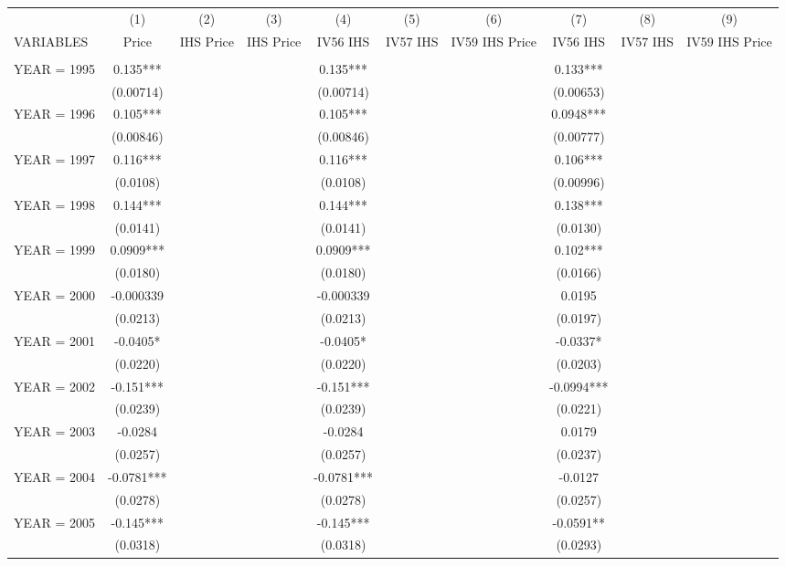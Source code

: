 \begin{tabular}{lccccccccc} \hline
 & (1) & (2) & (3) & (4) & (5) & (6) & (7) & (8) & (9) \\
VARIABLES & Price & IHS Price & IHS Price & IV56 IHS & IV57 IHS & IV59 IHS Price & IV56 IHS & IV57 IHS & IV59 IHS Price \\ \hline
 &  &  &  &  &  &  &  &  &  \\
YEAR = 1995 & 0.135*** &  &  & 0.135*** &  &  & 0.133*** &  &  \\
 & (0.00714) &  &  & (0.00714) &  &  & (0.00653) &  &  \\
YEAR = 1996 & 0.105*** &  &  & 0.105*** &  &  & 0.0948*** &  &  \\
 & (0.00846) &  &  & (0.00846) &  &  & (0.00777) &  &  \\
YEAR = 1997 & 0.116*** &  &  & 0.116*** &  &  & 0.106*** &  &  \\
 & (0.0108) &  &  & (0.0108) &  &  & (0.00996) &  &  \\
YEAR = 1998 & 0.144*** &  &  & 0.144*** &  &  & 0.138*** &  &  \\
 & (0.0141) &  &  & (0.0141) &  &  & (0.0130) &  &  \\
YEAR = 1999 & 0.0909*** &  &  & 0.0909*** &  &  & 0.102*** &  &  \\
 & (0.0180) &  &  & (0.0180) &  &  & (0.0166) &  &  \\
YEAR = 2000 & -0.000339 &  &  & -0.000339 &  &  & 0.0195 &  &  \\
 & (0.0213) &  &  & (0.0213) &  &  & (0.0197) &  &  \\
YEAR = 2001 & -0.0405* &  &  & -0.0405* &  &  & -0.0337* &  &  \\
 & (0.0220) &  &  & (0.0220) &  &  & (0.0203) &  &  \\
YEAR = 2002 & -0.151*** &  &  & -0.151*** &  &  & -0.0994*** &  &  \\
 & (0.0239) &  &  & (0.0239) &  &  & (0.0221) &  &  \\
YEAR = 2003 & -0.0284 &  &  & -0.0284 &  &  & 0.0179 &  &  \\
 & (0.0257) &  &  & (0.0257) &  &  & (0.0237) &  &  \\
YEAR = 2004 & -0.0781*** &  &  & -0.0781*** &  &  & -0.0127 &  &  \\
 & (0.0278) &  &  & (0.0278) &  &  & (0.0257) &  &  \\
YEAR = 2005 & -0.145*** &  &  & -0.145*** &  &  & -0.0591** &  &  \\
 & (0.0318) &  &  & (0.0318) &  &  & (0.0293) &  &  \\

\end{tabular}
